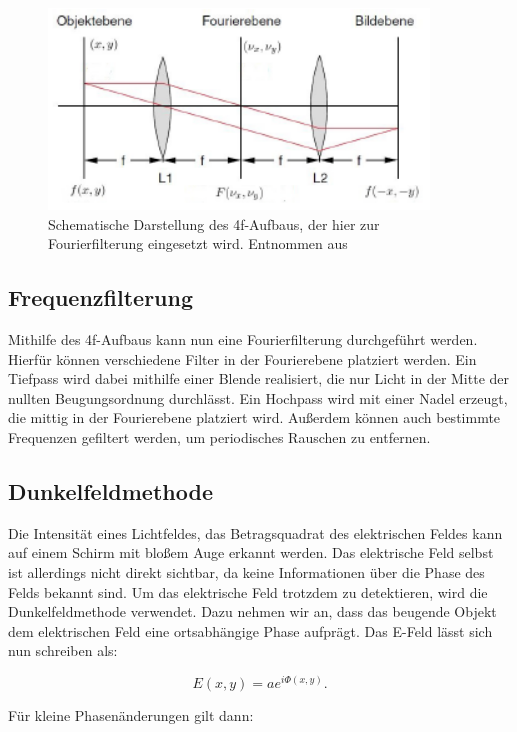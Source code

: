\begin{figure}[h!]
	\centering
	\includegraphics[width=0.9\textwidth]{4f.png}
	\caption{Schematische Darstellung des 4f-Aufbaus, der hier zur Fourierfilterung eingesetzt wird. Entnommen aus \cite[6]{anleitung-ws2014}}
	\label{4f}
\end{figure}

\subsection{Frequenzfilterung}
Mithilfe des 4f-Aufbaus kann nun eine Fourierfilterung durchgeführt werden. Hierfür können verschiedene Filter in der Fourierebene platziert werden. Ein Tiefpass wird dabei mithilfe einer Blende realisiert, die nur Licht in der Mitte der nullten Beugungsordnung durchlässt. Ein Hochpass wird mit einer Nadel erzeugt, die mittig in der Fourierebene platziert wird. Außerdem können auch bestimmte Frequenzen gefiltert werden, um periodisches Rauschen zu entfernen.

\subsection{Dunkelfeldmethode}
Die Intensität eines Lichtfeldes, das Betragsquadrat des elektrischen Feldes kann auf einem Schirm mit bloßem Auge erkannt werden. Das elektrische Feld selbst ist allerdings nicht direkt sichtbar, da keine Informationen über die Phase des Felds bekannt sind. Um das elektrische Feld trotzdem zu detektieren, wird die Dunkelfeldmethode verwendet. Dazu nehmen wir an, dass das beugende Objekt dem elektrischen Feld eine ortsabhängige Phase aufprägt. Das E-Feld lässt sich nun schreiben als:

\begin{equation}
	E(x, y) = a e^{i\Phi\left( x, y\right) }.
\end{equation}

Für kleine Phasenänderungen gilt dann:

